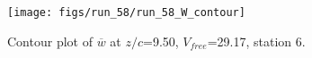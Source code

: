 \begin{figure}[H]
\centering
\texttt{[image: figs/run\_58/run\_58\_W\_contour]}
\caption{Contour plot of $\overline{w}$ at $z/c$=9.50, $V_{free}$=29.17, station 6.}
\end{figure}


